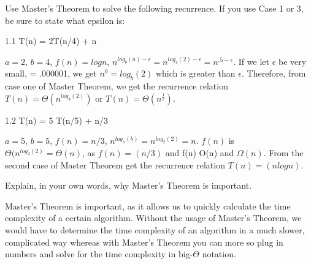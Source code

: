 \documentclass{article}
\begin{document}
\clearpage
\header
Use Master's Theorem to solve the following recurrence. If you use Case 1 or 3, be sure to state what epsilon is:
\item[]1.1 T(n) = 2T(n/4) + \log n

$a = 2$, $b = 4$, $f(n) = logn$,  $n^{log_b(a) - \epsilon} = n^{log_4(2) - \epsilon} = n^{.5 - \epsilon}.$  If we let $\epsilon$ be very small, = .000001, we get $n^{0} = log_b(2)$ which is greater than $\epsilon$. Therefore, from case one of Master Theorem, we get the recurrence relation $T(n) = \Theta(n^{log_4(2)})$ or $T(n) = \Theta(n^{\frac{1}{2}})$.

\item[]1.2 T(n) = 5 T(n/5) + n/3

$a = 5$, $b = 5$, $f(n) = n/3$, $n^{log_a(b)} = n^{log_2(2)} = n$. $f(n)$ is $\Theta (n^{log_2(2)} = \Theta (n)$, as $f(n) = (n/3)$ and f(n) O(n) and $\Omega(n)$. From the second case of Master Theorem get the recurrence relation $T(n) = (n logn)$.


\clearpage
\header
Explain, in your own words, why Master's Theorem is important.
\item[]Master's Theorem is important, as it allows us to quickly calculate the time complexity of a certain algorithm. Without the usage of Master's Theorem, we would have to determine the time complexity of an algorithm in a much slower, complicated way whereas with Master's Theorem you can more so plug in numbers and solve for the time complexity in big-$\Theta$ notation.
\end{document}
